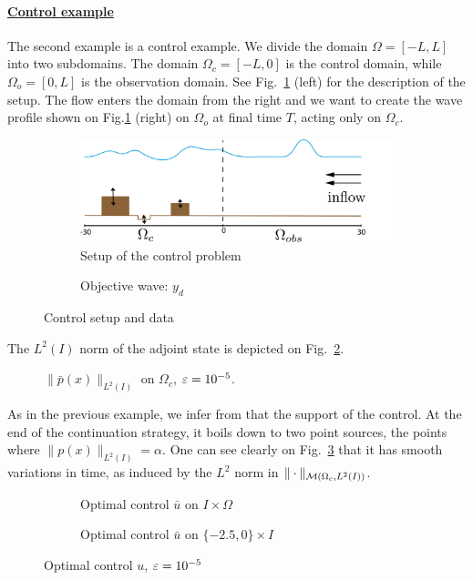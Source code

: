 \paragraph{\underline{Control example}}
The second example is a control example. We divide the domain $\Omega = [-L,L]$ into two subdomains. The domain $\Omega_c = [-L,0]$ is the control domain, while $\Omega_{o} = [0,L]$ is the observation domain. See Fig.~\ref{controlsetup} (left) for the description of the setup. The flow enters the domain from the right and we want to create the wave profile shown on Fig.\ref{controlsetup} (right) on $\Omega_{o}$ at final time $T$, acting only on $\Omega_c$.
\begin{figure}[htb]
\begin{subfigure}[b]{0.5\textwidth}
\centering
\includegraphics[width=\textwidth, height=3cm]{images/control_setup.png}
\caption{Setup of the control problem}
\end{subfigure}\qquad
\begin{subfigure}[b]{0.5\textwidth}
\centering

\caption{Objective wave: $y_d$}
\end{subfigure}
\caption{Control setup and data}
\label{controlsetup}
\end{figure}
The $L^2(I)$ norm of the adjoint state is depicted on Fig.~\ref{supportIP}. 
\begin{figure}[htb]
\centering

\caption{$\|\bar p(x)\|_{L^2(I)}$ on $\Omega_c$, $\varepsilon = 10^{-5}$.}
\label{supportIP}
\end{figure} 
As in the previous example, we infer from that the support of the control. At the end of the continuation strategy, it boils down to two point sources, the points where $\|p(x)\|_{L^2(I)} = \alpha$. One can see clearly on Fig.~\ref{recoveredcontrol2} that it has smooth variations in time, as induced by the $L^2$ norm in $\|\cdot\|_{\mathcal{M}(\Omega_c, L^{2}(I))}$.
\begin{figure}[htb]
 \begin{subfigure}[b]{0.48\textwidth}
 \centering
 
 \caption{Optimal control $\bar u$ on $I\times\Omega$}
 \end{subfigure}\qquad
 \begin{subfigure}[b]{0.48\textwidth}
 \centering
 
 \caption{Optimal control $\bar u$ on $\{-2.5,0\}\times I$}
 \end{subfigure}
 \caption{Optimal control $u$, $\varepsilon = 10^{-5}$}
 \label{recoveredcontrol2}
\end{figure} 

